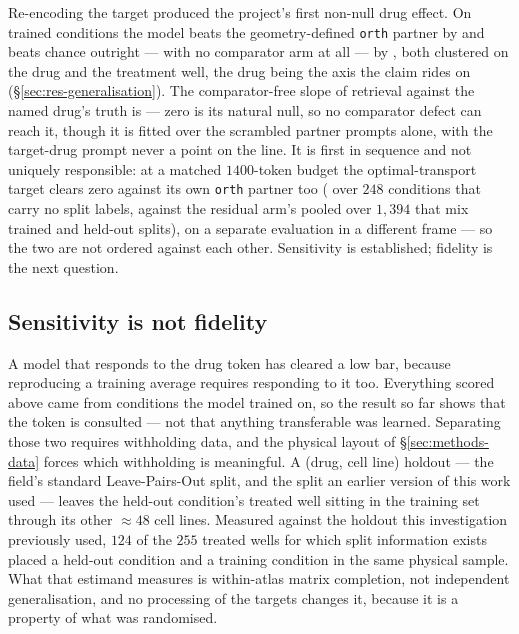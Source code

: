 \begin{claim}
Re-encoding the target produced the project's first non-null drug effect. On trained
conditions the model beats the geometry-defined \texttt{orth} partner by
 and beats chance
outright --- with no comparator arm at all --- by , both clustered on
the drug and the treatment well, the drug being the axis the claim rides on
(\S\ref{sec:res-generalisation}).
The comparator-free slope of retrieval against the named drug's truth is
 --- zero is its natural null, so no comparator defect can reach it,
though it is fitted over the scrambled partner prompts alone, with the target-drug prompt never a
point on the line.
It is first in sequence and not uniquely responsible: at a matched $1400$-token budget the
optimal-transport target clears zero against its own \texttt{orth} partner too
( over $248$ conditions that carry no split labels, against the
residual arm's  pooled over $1{,}394$ that mix trained and held-out
splits), on a separate evaluation in a different frame --- so the two are not ordered against each
other.
Sensitivity is established; fidelity is the next question.
\end{claim}

\subsection{Sensitivity is not fidelity}
\label{sec:methods-holdout}
\label{sec:res-generalisation}

A model that responds to the drug token has cleared a low bar, because reproducing a training
average requires responding to it too. Everything scored above came from conditions the model
trained on, so the result so far shows that the token is consulted --- not that anything
transferable was learned. Separating those two requires withholding data, and the physical layout of
\S\ref{sec:methods-data} forces which withholding is meaningful. A (drug, cell line) holdout ---
the field's standard Leave-Pairs-Out split, and the split an earlier version of this work used ---
leaves the held-out condition's treated well sitting in the training set through its other
$\approx 48$ cell lines. Measured against the holdout this investigation previously used, $124$ of
the $255$ treated wells for which split information exists placed a held-out condition and a
training condition in the same physical sample. What that estimand measures is within-atlas matrix completion, not independent
generalisation, and no processing of the targets changes it, because it is a property of what was
randomised.

